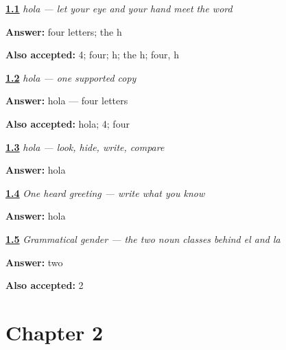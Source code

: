 \noindent\begin{minipage}[t]{\linewidth}
\raggedright
\hyperlink{review-ES-W00-hola-observe-final}{\textbf{1.1}} \emph{\emph{hola} — let your eye and your hand meet the word}\par
\small \textbf{Answer:} four letters; the h\par
\footnotesize \textbf{Also accepted:} 4; four; h; the h; four, h
\end{minipage}\par\medskip

\noindent\begin{minipage}[t]{\linewidth}
\raggedright
\hyperlink{review-ES-W00-hola-guided-copy-check}{\textbf{1.2}} \emph{\emph{hola} — one supported copy}\par
\small \textbf{Answer:} hola — four letters\par
\footnotesize \textbf{Also accepted:} hola; 4; four
\end{minipage}\par\medskip

\noindent\begin{minipage}[t]{\linewidth}
\raggedright
\hyperlink{review-ES-W00-hola-delayed-copy-check}{\textbf{1.3}} \emph{\emph{hola} — look, hide, write, compare}\par
\small \textbf{Answer:} hola\par
\end{minipage}\par\medskip

\noindent\begin{minipage}[t]{\linewidth}
\raggedright
\hyperlink{review-ES-W00-hola-dictation-answer}{\textbf{1.4}} \emph{One heard greeting — write what you know}\par
\small \textbf{Answer:} hola\par
\end{minipage}\par\medskip

\noindent\begin{minipage}[t]{\linewidth}
\raggedright
\hyperlink{review-ES-C01-genero-gramatical-class-count}{\textbf{1.5}} \emph{Grammatical gender — the two noun classes behind \emph{el} and \emph{la}}\par
\small \textbf{Answer:} two\par
\footnotesize \textbf{Also accepted:} 2
\end{minipage}\par\medskip

\section*{Chapter 2}

